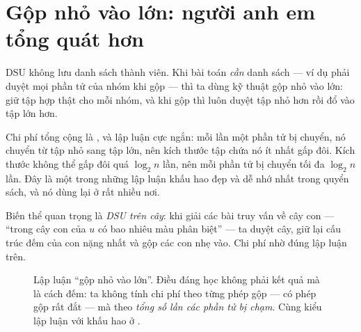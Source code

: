 \documentclass[../../algorithm.tex]{subfiles}
\begin{document}
\section{Gộp nhỏ vào lớn: người anh em tổng quát hơn}

DSU không lưu danh sách thành viên. Khi bài toán \emph{cần} danh sách --- ví dụ phải duyệt mọi phần tử của nhóm khi gộp --- thì ta dùng kỹ thuật gộp nhỏ vào lớn: giữ tập hợp thật cho mỗi nhóm, và khi gộp thì luôn duyệt tập nhỏ hơn rồi đổ vào tập lớn hơn.

Chi phí tổng cộng là , và lập luận cực ngắn: mỗi lần một phần tử bị chuyển, nó chuyển từ tập nhỏ sang tập lớn, nên kích thước tập chứa nó ít nhất gấp đôi. Kích thước không thể gấp đôi quá \(\log_2 n\) lần, nên mỗi phần tử bị chuyển tối đa \(\log_2 n\) lần. Đây là một trong những lập luận khấu hao đẹp và dễ nhớ nhất trong quyển sách, và nó dùng lại ở rất nhiều nơi.

Biến thể quan trọng là \emph{DSU trên cây}: khi giải các bài truy vấn về cây con --- ``trong cây con của \(u\) có bao nhiêu màu phân biệt'' --- ta duyệt cây, giữ lại cấu trúc đếm của con nặng nhất và gộp các con nhẹ vào. Chi phí  nhờ đúng lập luận trên.

\begin{figure}[H]\centering
{}
\caption{Lập luận ``gộp nhỏ vào lớn''. Điều đáng học không phải kết quả mà là cách đếm: ta không tính chi phí theo từng phép gộp --- có phép gộp rất đắt --- mà theo \emph{tổng số lần các phần tử bị chạm}. Cùng kiểu lập luận với khấu hao ở .}
\label{fig:small-to-large}
\end{figure}
\end{document}
